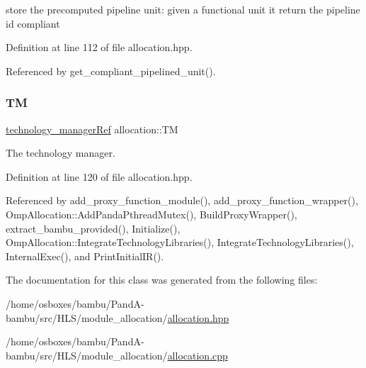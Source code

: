 store the precomputed pipeline unit\+: given a functional unit it return the pipeline id compliant 



Definition at line 112 of file allocation.\+hpp.



Referenced by get\+\_\+compliant\+\_\+pipelined\+\_\+unit().

\mbox{\label{classallocation_a4d459a70dabbb13058a43f912edcfe93}} 
\subsubsection{\texorpdfstring{TM}{TM}}
{\footnotesize\ttfamily \hyperlink{technology__manager_8hpp_a4b9ecd440c804109c962654f9227244e}{technology\+\_\+manager\+Ref} allocation\+::\+TM\hspace{0.3cm}{\ttfamily [protected]}}



The technology manager. 



Definition at line 120 of file allocation.\+hpp.



Referenced by add\+\_\+proxy\+\_\+function\+\_\+module(), add\+\_\+proxy\+\_\+function\+\_\+wrapper(), Omp\+Allocation\+::\+Add\+Panda\+Pthread\+Mutex(), Build\+Proxy\+Wrapper(), extract\+\_\+bambu\+\_\+provided(), Initialize(), Omp\+Allocation\+::\+Integrate\+Technology\+Libraries(), Integrate\+Technology\+Libraries(), Internal\+Exec(), and Print\+Initial\+I\+R().



The documentation for this class was generated from the following files\+:\begin{DoxyCompactItemize}
\item 
/home/osboxes/bambu/\+Pand\+A-\/bambu/src/\+H\+L\+S/module\+\_\+allocation/\hyperlink{allocation_8hpp}{allocation.\+hpp}\item 
/home/osboxes/bambu/\+Pand\+A-\/bambu/src/\+H\+L\+S/module\+\_\+allocation/\hyperlink{allocation_8cpp}{allocation.\+cpp}\end{DoxyCompactItemize}
